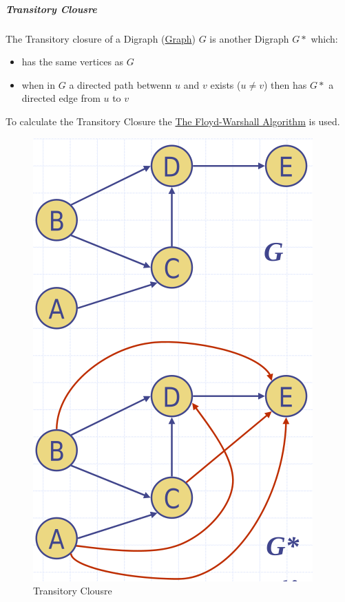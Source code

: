 \documentclass[11pt,twoside,twocolumn,landscape]{article}
\begin{document}
\subparagraph{Transitory Clousre}
\label{sec:orgba288e6}

The Transitory closure of a Digraph (\href{../../../roam/20220201163000-graph.org}{Graph}) \(G\) is another Digraph \(G*\) which:
\begin{itemize}
\item has the same vertices as \(G\)
\item when in \(G\) a directed path betwenn \(u\) and \(v\) exists (\(u \ne v\)) then has \(G*\) a directed edge from \(u\) to \(v\)
\end{itemize}

To calculate the Transitory Closure the \href{../../../roam/20220202113404-the_floyd_warshall_algorithm.org}{The Floyd-Warshall Algorithm} is used.


\begin{figure}[htbp]
\centering
\includegraphics[width=.9\linewidth]{img/transitiver_abschluss.png}
\caption{\label{fig:org4bf834a}Transitory Clousre}
\end{figure}
\end{document}
